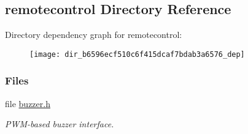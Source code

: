 \subsection{remotecontrol Directory Reference}
\label{dir_b6596ecf510c6f415dcaf7bdab3a6576}
Directory dependency graph for remotecontrol\+:
\nopagebreak
\begin{figure}[H]
\begin{center}
\leavevmode
\texttt{[image: dir\_b6596ecf510c6f415dcaf7bdab3a6576\_dep]}
\end{center}
\end{figure}
\subsubsection*{Files}
\begin{DoxyCompactItemize}
\item 
file \hyperlink{buzzer_8h}{buzzer.\+h}
\begin{DoxyCompactList}\small\item\em P\+W\+M-\/based buzzer interface. \end{DoxyCompactList}\end{DoxyCompactItemize}
